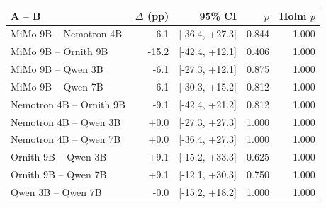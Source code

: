 \begin{tabular}{lrrrr}\toprule A -- B & $\Delta$ (pp) & 95\% CI & $p$ & Holm $p$\\\midrule
MiMo 9B -- Nemotron 4B & -6.1 & [-36.4, +27.3] & 0.844 & 1.000 \\
MiMo 9B -- Ornith 9B & -15.2 & [-42.4, +12.1] & 0.406 & 1.000 \\
MiMo 9B -- Qwen 3B & -6.1 & [-27.3, +12.1] & 0.875 & 1.000 \\
MiMo 9B -- Qwen 7B & -6.1 & [-30.3, +15.2] & 0.812 & 1.000 \\
Nemotron 4B -- Ornith 9B & -9.1 & [-42.4, +21.2] & 0.812 & 1.000 \\
Nemotron 4B -- Qwen 3B & +0.0 & [-27.3, +27.3] & 1.000 & 1.000 \\
Nemotron 4B -- Qwen 7B & +0.0 & [-36.4, +27.3] & 1.000 & 1.000 \\
Ornith 9B -- Qwen 3B & +9.1 & [-15.2, +33.3] & 0.625 & 1.000 \\
Ornith 9B -- Qwen 7B & +9.1 & [-12.1, +30.3] & 0.750 & 1.000 \\
Qwen 3B -- Qwen 7B & -0.0 & [-15.2, +18.2] & 1.000 & 1.000 \\
\bottomrule\end{tabular}
